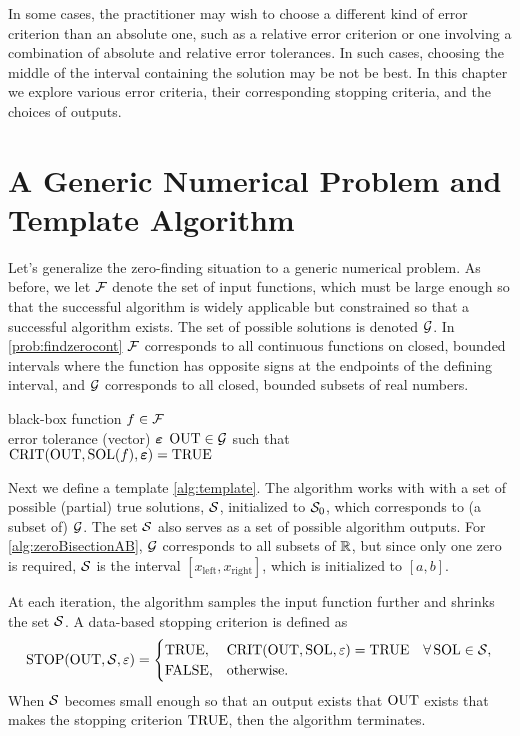 In some cases, the practitioner may wish to choose a different kind of error criterion than an absolute one, such as a relative error criterion or one involving a combination of absolute and relative error tolerances.  In such cases, choosing the middle of the interval containing the solution may be not be best.  In this chapter we explore various error criteria, their corresponding stopping criteria, and the choices of outputs.

\section{A Generic Numerical Problem and Template Algorithm}

Let's generalize the zero-finding situation to a generic numerical problem.  As before, we let $\mathcal{F}$ denote the set of input functions, which must be large enough so that the successful algorithm is widely applicable but constrained so that a successful algorithm exists. The set of possible solutions is denoted $\mathcal{G}$.  In \cref{prob:findzerocont} $\mathcal{F}$ corresponds to all continuous functions on closed, bounded intervals where the function has opposite signs at the endpoints of the defining interval, and $\mathcal{G}$ corresponds to all closed, bounded subsets of real numbers.

\begin{NumProblem}
\label{prob:generalProblem}
{black-box function $f \in \mathcal{F}$ \\ error tolerance (vector) $\boldsymbol{\varepsilon}$}
{$\operatorname{OUT} \in \mathcal{G}$ such that \\ \qquad $\operatorname{CRIT}(\operatorname{OUT},\operatorname{SOL}(f),\boldsymbol{\varepsilon}) = \textup{TRUE}$}
\end{NumProblem}


Next we define a template \cref{alg:template}.  The algorithm works with with a set of possible (partial) true solutions, $\mathcal{S}$, initialized to $\mathcal{S}_0$, which corresponds to (a subset of) $\mathcal{G}$.  The set $\mathcal{S}$ also serves as a set of possible algorithm outputs.  For \cref{alg:zeroBisectionAB}, $\mathcal{G}$ corresponds to all subsets of $\mathbb{R}$, but since only one zero is required, $\mathcal{S}$ is the interval $[x_{\text{left}},x_{\text{right}}]$, which is initialized to $[a,b]$. 

At each iteration, the algorithm samples the input function further and shrinks the set $\mathcal{S}$.  A data-based stopping criterion is defined as 
\begin{equation}
    \operatorname{STOP}(\operatorname{OUT},\mathcal{S},\varepsilon) = \begin{cases} \textup{TRUE}, & \operatorname{CRIT}(\operatorname{OUT},\operatorname{SOL},\varepsilon) = \textup{TRUE} \quad \forall \operatorname{SOL} \in \mathcal{S}, \\ \textup{FALSE}, & \text{otherwise} .
    \end{cases}
\end{equation}
When $\mathcal{S}$ becomes small enough so that an output exists that $\operatorname{OUT}$ exists that makes the stopping criterion $\textup{TRUE}$, then the algorithm terminates.

